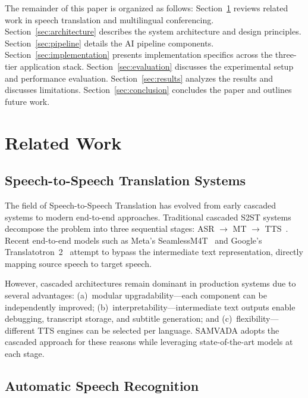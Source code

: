 \documentclass[conference]{IEEEtran}
\begin{document}
The remainder of this paper is organized as follows: Section~\ref{sec:related} reviews related work in speech translation and multilingual conferencing. Section~\ref{sec:architecture} describes the system architecture and design principles. Section~\ref{sec:pipeline} details the AI pipeline components. Section~\ref{sec:implementation} presents implementation specifics across the three-tier application stack. Section~\ref{sec:evaluation} discusses the experimental setup and performance evaluation. Section~\ref{sec:results} analyzes the results and discusses limitations. Section~\ref{sec:conclusion} concludes the paper and outlines future work.

\section{Related Work}
\label{sec:related}

\subsection{Speech-to-Speech Translation Systems}

The field of Speech-to-Speech Translation has evolved from early cascaded systems to modern end-to-end approaches. Traditional cascaded S2ST systems decompose the problem into three sequential stages: ASR $\rightarrow$ MT $\rightarrow$ TTS~\cite{nakamura2006atr}. Recent end-to-end models such as Meta's SeamlessM4T~\cite{seamlessm4t} and Google's Translatotron~2~\cite{translatotron2} attempt to bypass the intermediate text representation, directly mapping source speech to target speech.

However, cascaded architectures remain dominant in production systems due to several advantages: (a)~modular upgradability---each component can be independently improved; (b)~interpretability---intermediate text outputs enable debugging, transcript storage, and subtitle generation; and (c)~flexibility---different TTS engines can be selected per language. SAMVADA adopts the cascaded approach for these reasons while leveraging state-of-the-art models at each stage.

\subsection{Automatic Speech Recognition}
\end{document}
